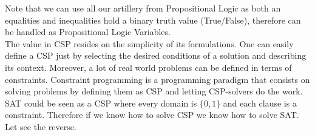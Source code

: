 Note that we can use all our artillery from Propositional Logic as both an equalities and inequalities hold a binary truth value (True/False), therefore can be handled as Propositional Logic Variables. \\

The value in CSP resides on the simplicity of its formulations.  One can  easily define a CSP just by selecting the desired conditions of a solution and describing its context. Moreover, a lot of real world problems can be defined in terms of constraints. Constraint programming is a programming paradigm that consists on solving problems by defining them as CSP and letting CSP-solvers do the work.\\

SAT could be seen as a CSP where every domain is $\{0,1\}$ and each clause is a constraint. Therefore if we know how to solve CSP we know how to solve SAT. Let see the reverse.

